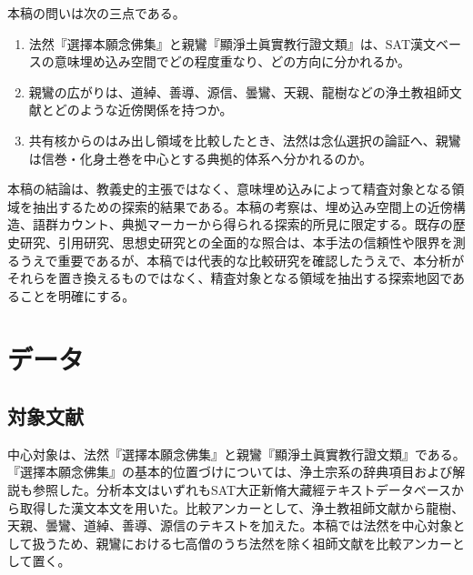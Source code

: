 \documentclass[uplatex,dvipdfmx,11pt,a4paper]{jsarticle}
\begin{document}
本稿の問いは次の三点である。

\begin{enumerate}
  \item 法然『選擇本願念佛集』と親鸞『顯淨土眞實教行證文類』は、SAT漢文ベースの意味埋め込み空間でどの程度重なり、どの方向に分かれるか。
  \item 親鸞の広がりは、道綽、善導、源信、曇鸞、天親、龍樹などの浄土教祖師文献とどのような近傍関係を持つか。
  \item 共有核からのはみ出し領域を比較したとき、法然は念仏選択の論証へ、親鸞は信巻・化身土巻を中心とする典拠的体系へ分かれるのか。
\end{enumerate}

本稿の結論は、教義史的主張ではなく、意味埋め込みによって精査対象となる領域を抽出するための探索的結果である。本稿の考察は、埋め込み空間上の近傍構造、語群カウント、典拠マーカーから得られる探索的所見に限定する。既存の歴史研究、引用研究、思想史研究との全面的な照合は、本手法の信頼性や限界を測るうえで重要であるが、本稿では代表的な比較研究を確認したうえで、本分析がそれらを置き換えるものではなく、精査対象となる領域を抽出する探索地図であることを明確にする。

\section{データ}

\subsection{対象文献}

中心対象は、法然『選擇本願念佛集』と親鸞『顯淨土眞實教行證文類』である。『選擇本願念佛集』の基本的位置づけについては、浄土宗系の辞典項目および解説も参照した\cite{jodoshuzensho-senchaku,jodoshu-senchaku}。分析本文はいずれもSAT大正新脩大藏經テキストデータベースから取得した漢文本文を用いた。比較アンカーとして、浄土教祖師文献から龍樹、天親、曇鸞、道綽、善導、源信のテキストを加えた。本稿では法然を中心対象として扱うため、親鸞における七高僧のうち法然を除く祖師文献を比較アンカーとして置く。
\end{document}
